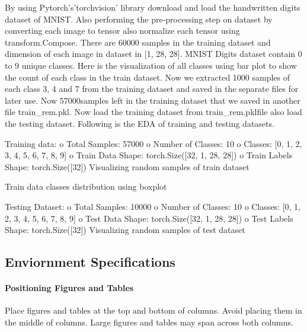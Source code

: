 \documentclass[conference]{IEEEtran}
\begin{document}
By using Pytorch’s’torchvision’ library download and load the handwritten digits dataset of MNIST. Also performing the pre-processing step on dataset by converting each image to tensor also normalize each tensor using transform.Compose. There are 60000 samples in the training dataset and dimension of each image in dataset in [1, 28, 28]. MNIST Digits dataset contain 0 to 9 unique classes. Here is the visualization of all classes using bar plot to show the count of each class in the train dataset.
Now we extracted 1000 samples of each class 3, 4 and 7 from the training dataset and saved in the separate files for later use. Now 57000samples left in the training dataset that we saved in another file train\_rem.pkl. Now load the training dataset from train\_rem.pklfile also load the testing dataset. Following is the EDA of training and testing datasets.

Training data:
o	Total Samples: 57000
o	Number of Classes: 10
o	Classes: [0, 1, 2, 3, 4, 5, 6, 7, 8, 9]
o	Train Data Shape: torch.Size([32, 1, 28, 28])
o	Train Labels Shape: torch.Size([32])
Visualizing random samples of train dataset

Train data classes distribution using boxplot

Testing Dataset:
o	Total Samples: 10000
o	Number of Classes: 10
o	Classes: [0, 1, 2, 3, 4, 5, 6, 7, 8, 9]
o	Test Data Shape: torch.Size([32, 1, 28, 28])
o	Test Labels Shape: torch.Size([32])
Visualizing random samples of test dataset





\subsection{Enviornment Specifications}
\paragraph{Positioning Figures and Tables} Place figures and tables at the top and 
bottom of columns. Avoid placing them in the middle of columns. Large 
figures and tables may span across both columns. 
\end{document}
